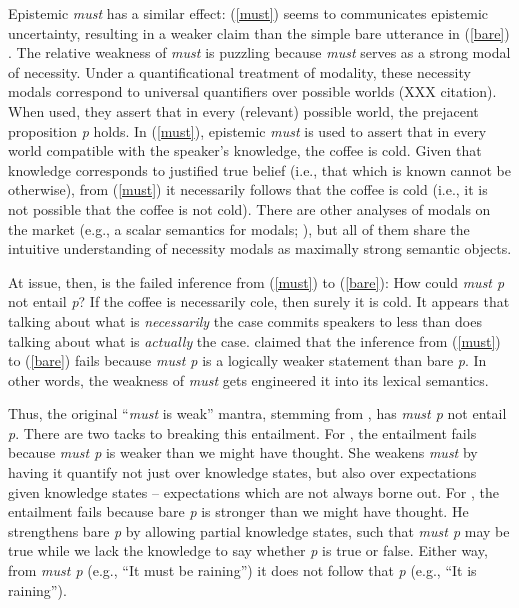 \documentclass[11pt]{article}
\begin{document}
Epistemic \emph{must} has a similar effect: (\ref{must}) seems to communicates epistemic uncertainty, resulting in a weaker claim than the simple bare utterance in (\ref{bare}) \citep{karttunen1972}. The relative weakness of \emph{must} is puzzling because \emph{must} serves as a strong modal of necessity. Under a quantificational treatment of modality, these necessity modals correspond to universal quantifiers over possible worlds (XXX citation). When used, they assert that in every (relevant) possible world, the prejacent proposition \emph{p} holds. In (\ref{must}), epistemic \emph{must} is used to assert that in every world compatible with the speaker's knowledge, the coffee is cold. Given that knowledge corresponds to justified true belief (i.e., that which is known cannot be otherwise), from (\ref{must}) it necessarily follows that the coffee is cold (i.e., it is not possible that the coffee is not cold). There are other analyses of modals on the market (e.g., a scalar semantics for modals; \citealp{lassiter2011}), but all of them share the intuitive understanding of necessity modals as maximally strong semantic objects.

At issue, then, is the failed inference from (\ref{must}) to (\ref{bare}): How could \emph{must p} not entail \emph{p}? If the coffee is necessarily cole, then surely it is cold. It appears that talking about what is \emph{necessarily} the case commits speakers to less than does talking about what is \emph{actually} the case. \cite{karttunen1972} claimed that the inference from (\ref{must}) to (\ref{bare}) fails because \emph{must p} is a logically weaker statement than bare \emph{p}. In other words, the weakness of \emph{must} gets engineered it into its lexical semantics. 

Thus, the original ``\emph{must} is weak'' mantra, stemming from \cite{karttunen1972}, has \emph{must p} not entail \emph{p}. There are two tacks to breaking this entailment. For \cite{kratzer1991}, the entailment fails because  \emph{must p} is weaker than we might have thought. She weakens \emph{must} by having it quantify not just over knowledge states, but also over expectations given knowledge states -- expectations which are not always borne out. For \cite{veltman1985}, the entailment fails because bare \emph{p} is stronger than we might have thought. He strengthens bare \emph{p} by allowing partial knowledge states, such that \emph{must p} may be true while we lack the knowledge to say whether \emph{p} is true or false. Either way, from \emph{must p} (e.g., ``It must be raining'') it does not follow that \emph{p} (e.g., ``It is raining'').
\end{document}
